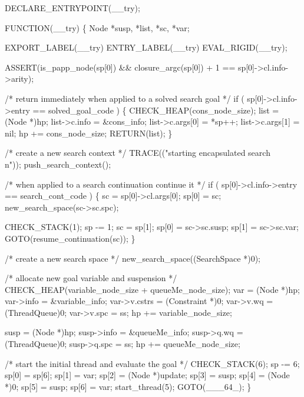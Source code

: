 \nwenddocs{}\plusendmoddef\nwstartdeflinemarkup{}\nwenddeflinemarkup
DECLARE_ENTRYPOINT(__try);

FUNCTION(__try)
\{
    Node *susp, *list, *sc, *var;

    EXPORT_LABEL(__try)
 ENTRY_LABEL(__try)
    EVAL_RIGID(__try);

    ASSERT(is_papp_node(sp[0]) &&
           closure_argc(sp[0]) + 1 == sp[0]->cl.info->arity);

    /* return immediately when applied to a solved search goal */
    if ( sp[0]->cl.info->entry == solved_goal_code )
    \{
        CHECK_HEAP(cons_node_size);
        list            = (Node *)hp;
        list->c.info    = &cons_info;
        list->c.args[0] = *sp++;
        list->c.args[1] = nil;
        hp             += cons_node_size;
        RETURN(list);
    \}

    /* create a new search context */
    TRACE(("starting encapsulated search\\n"));
    push_search_context();

    /* when applied to a search continuation continue it */
    if ( sp[0]->cl.info->entry == search_cont_code )
    \{
        sc    = sp[0]->cl.args[0];
        sp[0] = sc;   
        new_search_space(sc->sc.spc);

        CHECK_STACK(1);
        sp   -= 1;
        sc    = sp[1];
        sp[0] = sc->sc.susp;
        sp[1] = sc->sc.var;
        GOTO(resume_continuation(sc));
    \}

    /* create a new search space */
    new_search_space((SearchSpace *)0);

    /* allocate new goal variable and suspension */
    CHECK_HEAP(variable_node_size + queueMe_node_size);
    var          = (Node *)hp;
    var->info    = &variable_info;
    var->v.cstrs = (Constraint *)0;
    var->v.wq    = (ThreadQueue)0;
    var->v.spc   = ss;
    hp          += variable_node_size;

    susp        = (Node *)hp;
    susp->info  = &queueMe_info;
    susp->q.wq  = (ThreadQueue)0;
    susp->q.spc = ss;
    hp         += queueMe_node_size;

    /* start the initial thread and evaluate the goal */
    CHECK_STACK(6);
    sp   -= 6;
    sp[0] = sp[6];
    sp[1] = var;
    sp[2] = (Node *)update;
    sp[3] = susp;
    sp[4] = (Node *)0;
    sp[5] = susp;
    sp[6] = var;
    start_thread(5);
    GOTO(___64_);
\}

